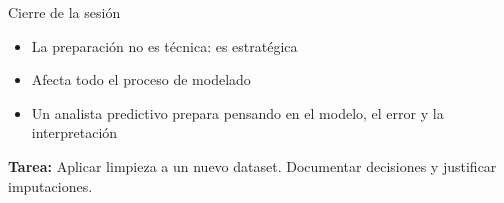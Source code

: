 \documentclass{beamer}
\begin{document}
\begin{frame}{Cierre de la sesión}
\begin{itemize}
    \item La preparación no es técnica: es estratégica
    \item Afecta todo el proceso de modelado
    \item Un analista predictivo prepara pensando en el modelo, el error y la interpretación
\end{itemize}
\vspace{0.5cm}
\textbf{Tarea:} Aplicar limpieza a un nuevo dataset. Documentar decisiones y justificar imputaciones.
\end{frame}
\end{document}
